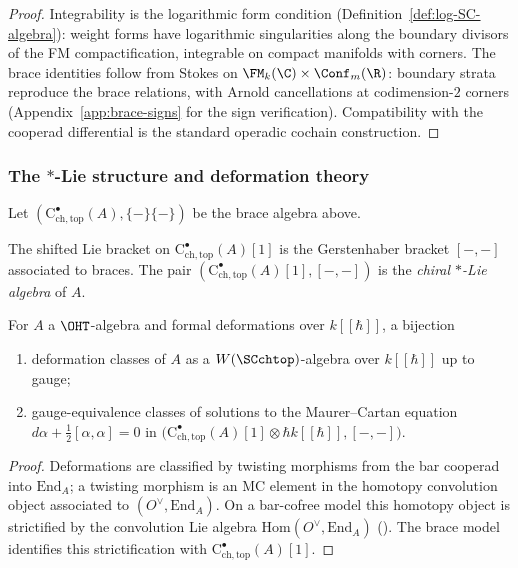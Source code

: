 \begin{proof}
Integrability is the logarithmic form condition (Definition~\ref{def:log-SC-algebra}): weight forms have logarithmic singularities along the boundary divisors of the FM compactification, integrable on compact manifolds with corners. The brace identities follow from Stokes on $\FM_k(\C) \times \Conf_m(\R)$: boundary strata reproduce the brace relations, with Arnold cancellations at codimension-$2$ corners (Appendix~\ref{app:brace-signs} for the sign verification). Compatibility with the cooperad differential is the standard operadic cochain construction.
\end{proof}

\subsubsection{The \texorpdfstring{$\ast$}{*}-Lie structure and deformation theory}
\label{subsec:star-Lie}
Let $(\mathrm{C}^\bullet_{\mathrm{ch,top}}(A),\{-\}\{-\})$ be the brace algebra above.

\begin{definition}
\label{def:star-Lie}
The shifted Lie bracket on $\mathrm{C}^\bullet_{\mathrm{ch,top}}(A)[1]$ is the Gerstenhaber bracket $[-,-]$ associated to braces. The pair $(\mathrm{C}^\bullet_{\mathrm{ch,top}}(A)[1],[-,-])$ is the \emph{chiral $\ast$-Lie algebra} of $A$.
\end{definition}

\begin{theorem}
\label{thm:MC-deformations}
For $A$ a $\OHT$-algebra and formal deformations over $k[\![\hbar]\!]$, a bijection
\begin{enumerate}[label=(\alph*)]
 \item deformation classes of $A$ as a $W(\SCchtop)$-algebra over $k[\![\hbar]\!]$ up to gauge;
 \item gauge-equivalence classes of solutions to the Maurer--Cartan equation
 \(
 d\alpha + \tfrac{1}{2}[\alpha,\alpha]=0
 \)
 in $\bigl(\mathrm{C}^\bullet_{\mathrm{ch,top}}(A)[1]\otimes \hbar k[\![\hbar]\!],[-,-]\bigr)$.
\end{enumerate}
\end{theorem}

\begin{proof}
Deformations are classified by twisting morphisms from the bar cooperad into $\mathrm{End}_A$; a twisting morphism is an MC element in the homotopy convolution object associated to $(O^\vee,\mathrm{End}_A)$. On a bar-cofree model this homotopy object is strictified by the convolution Lie algebra $\mathrm{Hom}(O^\vee,\mathrm{End}_A)$ (\cite{GK94,Val07}). The brace model identifies this strictification with $\mathrm{C}^\bullet_{\mathrm{ch,top}}(A)[1]$.
\end{proof}

